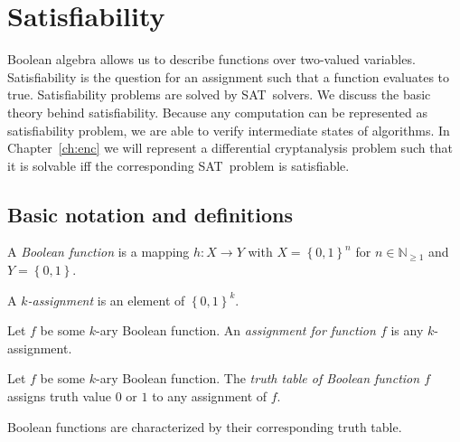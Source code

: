 \renewcommand*\chappic{img/satisfiability.pdf}
\renewcommand*\chapquote{What idiot called them logic errors rather than bool shit?}
\renewcommand*\chapquotesrc{Unknown}
\chapter{Satisfiability}
\label{ch:sat}
%
Boolean algebra allows us to describe functions over two-valued variables.
Satisfiability is the question for an assignment such that a function
evaluates to true. Satisfiability problems are solved by SAT~solvers.
We discuss the basic theory behind satisfiability. Because any computation
can be represented as satisfiability problem, we are able to verify intermediate
states of algorithms. In Chapter~\ref{ch:enc}
we will represent a differential cryptanalysis problem such that it is
solvable iff the corresponding SAT~problem is satisfiable.

\section{Basic notation and definitions}
\label{sec:sat-intro}
%
\begin{defi}
  A \emph{Boolean function} is a mapping $h: X \to Y$ with $X = \left\{0,1\right\}^n$
  for $n \in \mathbb N_{\geq 1}$ and $Y = \left\{0,1\right\}$.
\end{defi}

\begin{defi}[Assignment]
  A \emph{$k$-assignment} is an element of $\left\{0,1\right\}^k$.

  \noindent
  Let $f$ be some $k$-ary Boolean function.
  An \emph{assignment for function $f$} is any $k$-assignment.
\end{defi}

\begin{defi}
  Let $f$ be some $k$-ary Boolean function.
  The \emph{truth table of Boolean function $f$} assigns
  truth value $0$ or $1$ to any assignment of $f$.
\end{defi}

Boolean functions are characterized by their corresponding truth table.


